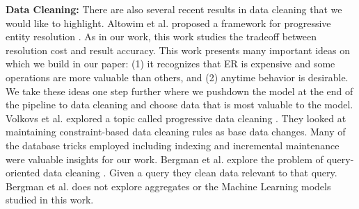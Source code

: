 \noindent \textbf{Data Cleaning: } There are also several recent results in data cleaning that we would like to highlight. Altowim et al. proposed a framework for progressive entity resolution \cite{altowim2014progressive}. As in our work, this work studies the tradeoff between resolution cost and result accuracy. This work presents many important ideas on which we build in our paper: (1) it recognizes that ER is expensive and some operations are more valuable than others, and (2) anytime behavior is desirable. We take these ideas one step further where we pushdown the model at the end of the pipeline to data cleaning and choose data that is most valuable to the model. Volkovs et al. explored a topic called progressive data cleaning \cite{volkovs2014continuous}. They looked at maintaining constraint-based data cleaning rules as base data changes. Many of the database tricks employed including indexing and incremental maintenance were valuable insights for our work. Bergman et al. explore the problem of query-oriented data cleaning \cite{bergman2015query}. Given a query they clean data relevant to that query. Bergman et al. does not explore aggregates or the Machine Learning models studied in this work.


